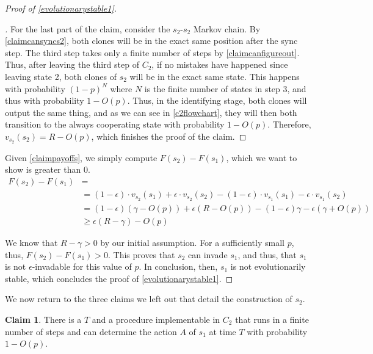 \documentclass[11pt]{amsart}
\theoremstyle{definition}
\newtheorem{claim}[theorem]{Claim}
\theoremstyle{remark}
\newenvironment{subproof}[1][\proofname]{%
  \renewcommand{\qedsymbol}{$\blacksquare$}%
  \begin{proof}[#1]%
}{%
  \end{proof}%
}
\begin{document}
\begin{proof}[Proof of \cref{evolutionarystable1}]
\begin{subproof}
        For the last part of the claim, consider the $s_2$-$s_2$ Markov chain. By \cref{claimcansyncs2}, both clones will be in the exact same position after the sync step. The third step takes only a finite number of steps by \cref{claimcanfigureout}. Thus, after leaving the third step of $C_2$, if no mistakes have happened since leaving state 2, both clones of $s_2$ will be in the exact same state. This happens with probability $(1-p)^N$ where $N$ is the finite number of states in step 3, and thus with probability $1 - O(p)$. Thus, in the identifying stage, both clones will output the same thing, and as we can see in \cref{c2flowchart}, they will then both transition to the always cooperating state with probability $1 - O(p)$. Therefore, $v_{s_2}(s_2) = R - O(p)$, which finishes the proof of the claim.
      \end{subproof}

      Given \cref{claimpayoffs}, we simply compute $F(s_2) - F(s_1)$, which we want to show is greater than 0.
      \begin{align*}
        F(s_2) - F(s_1) &= \\
        &= (1 - \epsilon) \cdot v_{s_2}(s_1) + \epsilon \cdot v_{s_2}(s_2) - (1 - \epsilon) \cdot v_{s_1}(s_1) - \epsilon \cdot v_{s_1}(s_2) \\
        &= (1 - \epsilon) (\gamma - O(p)) + \epsilon (R - O(p)) - (1-\epsilon) \gamma - \epsilon (\gamma + O(p)) \\
        &\geq \epsilon (R - \gamma) - O(p)
      \end{align*}

      We know that $R - \gamma > 0$ by our initial assumption. For a sufficiently small $p$, thus, $F(s_2) - F(s_1) > 0$. This proves that $s_2$ can invade $s_1$, and thus, that $s_1$ is not $\epsilon$-invadable for this value of $p$. In conclusion, then, $s_1$ is not evolutionarily stable, which concludes the proof of \cref{evolutionarystable1}.

    \end{proof}

      We now return to the three claims we left out that detail the construction of $s_2$.

      \begin{claim}
        There is a $T$ and a procedure implementable in $C_2$ that runs in a finite number of steps and can determine the action $A$ of $s_1$ at time $T$ with probability $1 - O(p)$.
      \end{claim}
\end{document}
